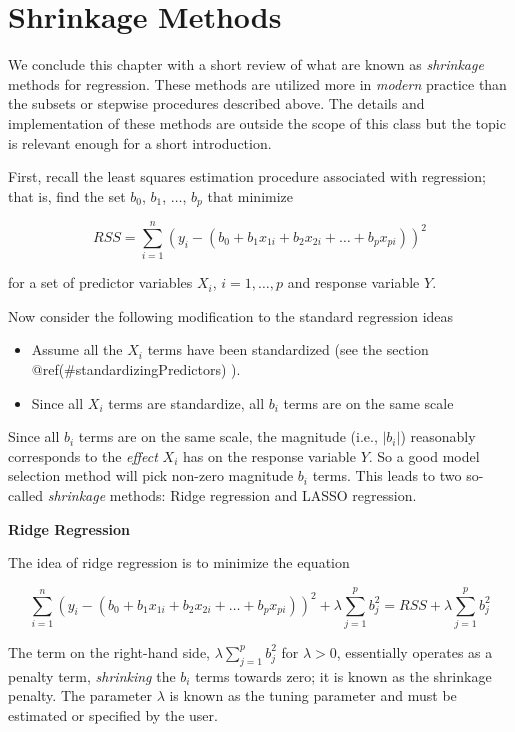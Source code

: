 \documentclass[
]{book}
\providecommand{\tightlist}{%
  \setlength{\itemsep}{0pt}\setlength{\parskip}{0pt}}
\begin{document}
\hypertarget{shrinkage-methods}{%
\section{Shrinkage Methods}\label{shrinkage-methods}}

We conclude this chapter with a short review of what are known as \emph{shrinkage} methods for regression. These methods are utilized more in \emph{modern} practice than the subsets or stepwise procedures described above. The details and implementation of these methods are outside the scope of this class but the topic is relevant enough for a short introduction.

First, recall the least squares estimation procedure associated with regression; that is, find the set \(b_0\), \(b_1\), \(\ldots\), \(b_p\) that minimize

\[RSS = \sum_{i=1}^n \left(y_i - (b_0 + b_1 x_{1i} + b_2 x_{2i} + \ldots + b_p x_{pi})\right)^2\]

for a set of predictor variables \(X_i\), \(i=1,\ldots,p\) and response variable \(Y\).

Now consider the following modification to the standard regression ideas

\begin{itemize}
\tightlist
\item
  Assume all the \(X_i\) terms have been standardized (see the section @ref(\#standardizingPredictors) ).
\item
  Since all \(X_i\) terms are standardize, all \(b_i\) terms are on the same scale
\end{itemize}

Since all \(b_i\) terms are on the same scale, the magnitude (i.e., \(|b_i|\)) reasonably corresponds to the \emph{effect} \(X_i\) has on the response variable \(Y\). So a good model selection method will pick non-zero magnitude \(b_i\) terms. This leads to two so-called \emph{shrinkage} methods: Ridge regression and LASSO regression.

\textbf{Ridge Regression}

The idea of ridge regression is to minimize the equation

\[\sum_{i=1}^n \left(y_i - (b_0 + b_1 x_{1i} + b_2 x_{2i} + \ldots + b_p x_{pi})\right)^2 + \lambda\sum_{j=1}^p b_j^2 = RSS + \lambda\sum_{j=1}^p b_j^2\]

The term on the right-hand side, \(\lambda\sum_{j=1}^p b_j^2\) for \(\lambda>0\), essentially operates as a penalty term, \emph{shrinking} the \(b_i\) terms towards zero; it is known as the shrinkage penalty. The parameter \(\lambda\) is known as the tuning parameter and must be estimated or specified by the user.
\end{document}
